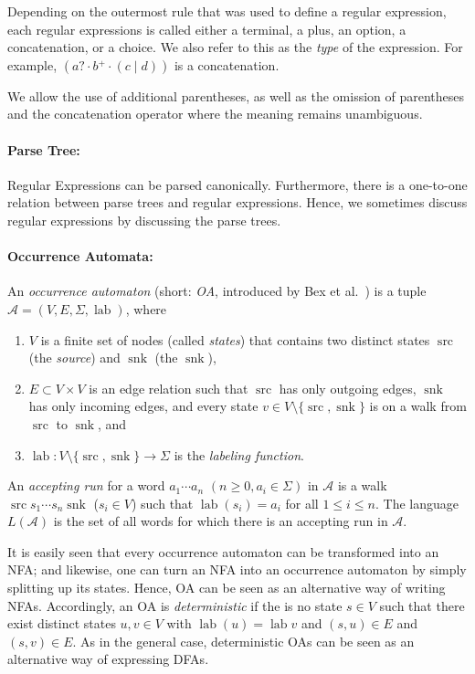 \documentclass[a4paper,11pt, svgnames,titlepage]{article}
\newcommand{\rxp}{{^\mathtt{+}}}
\newcommand{\rxo}{\mathtt{?}}
\newcommand{\rxc}{\cdot}
\DeclareMathOperator{\ror}{\mathtt{|}}
\DeclareMathOperator{\lab}{lab}
\DeclareMathOperator{\src}{src}
\DeclareMathOperator{\snk}{snk}
\begin{document}
Depending on the outermost rule that was used to define a regular expression, each regular expressions is called either a terminal, a plus, an option, a concatenation, or a choice. We also refer to this as the \emph{type} of the expression. For example, $(a\rxo \rxc b\rxp \rxc (c\ror d))$ is a concatenation.

We allow the use of additional parentheses, as well as the omission of parentheses and the concatenation operator where the meaning remains unambiguous.

\paragraph{Parse Tree:} Regular Expressions can be parsed canonically. Furthermore, there is a one-to-one relation between parse trees and regular expressions. Hence, we sometimes discuss regular expressions by discussing the parse trees.

\paragraph{Occurrence Automata:} An \emph{occurrence automaton} (short: \emph{OA}, introduced by Bex et al.~\cite{bex:kore}) is a tuple $\mathcal{A}=(V,E,\Sigma,\lab)$, where 
\begin{enumerate}
	\item $V$ is a finite set of nodes (called \emph{states}) that contains two distinct states $\src$ (the \emph{source}) and $\snk$ (the $\snk$),
	\item $E\subset V\times V$ is an edge relation such that $\src$ has only outgoing edges, $\snk$ has only incoming edges, and every state $v\in V\setminus\{\src,\snk\}$ is on a walk from $\src$ to $\snk$, and
	\item $\lab: V\setminus\{\src,\snk\} \to \Sigma $ is the \emph{labeling function}. 
\end{enumerate}
An \emph{accepting run} for a word $a_1 \cdots a_n$ $(n\geq 0, a_i\in\Sigma)$ in $\mathcal{A}$ is a walk $\src s_1 \cdots s_n \snk$ ($s_i\in V$) such that $\lab(s_i)=a_i$ for all $1\leq i \leq n$. The language $L(\mathcal{A})$ is the set of all words for which there is an accepting run in $\mathcal{A}$.

It is easily seen that every occurrence automaton can be transformed into an NFA; and likewise, one can turn an NFA into an occurrence automaton by simply splitting up its states. Hence, OA can be seen  as an alternative way of writing NFAs. Accordingly, an OA is \emph{deterministic} if the is no state $s\in V$ such that there exist distinct states $u,v\in V$ with $\lab(u)=\lab{v}$ and $(s,u)\in E$ and $(s,v)\in E$. As in the general case, deterministic OAs can be seen as an alternative way of expressing DFAs.
\end{document}
